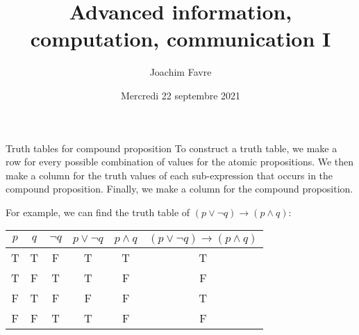 \documentclass{article}
\title{Advanced information, computation, communication I}
\author{Joachim Favre}
\date{Mercredi 22 septembre 2021}
\begin{document}
\maketitle


\begin{parag}{Truth tables for compound proposition}
    To construct a truth table, we make a row for every possible combination of values for the atomic propositions. We then make a column for the truth values of each sub-expression that occurs in the compound proposition. Finally, we make a column for the compound proposition.

    For example, we can find the truth table of $\left(p \lor \lnot q\right) \to \left(p \land q\right)$:
    \begin{center}
        \begin{tabular}{cc|c|c|c|c}
            $p$ & $q$ & $\lnot q$ & $p \lor \lnot q$ & $p \land q$ & $\left(p \lor \lnot q\right) \to \left(p \land q\right)$ \\
            \hline
            T & T & F & T & T & T \\
            T & F & T & T & F & F \\
            F & T & F & F & F & T \\
            F & F & T & T & F & F \\
        \end{tabular}
    \end{center}
\end{parag}
\end{document}
